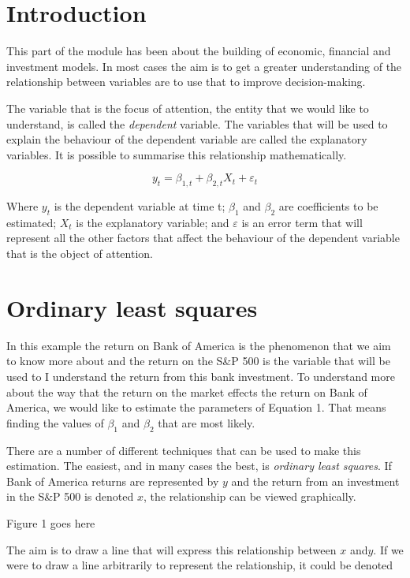 \documentclass{article}\usepackage[]{graphicx}\usepackage[]{color}
\begin{document}
\section{Introduction}

This part of the module has been about the building of economic, financial and investment models.  In most cases the aim is to get a greater understanding of the relationship between variables are to use that to improve decision-making. 

The variable that is the focus of attention, the entity that we would like to understand, is called the \emph{dependent} variable.  The variables that will be used to explain the behaviour of the dependent variable are called the explanatory variables.   It is possible to summarise this relationship mathematically.

\begin{equation}
y_t = \beta_{1, t} + \beta_{2, t} X_t + \varepsilon_t
\end{equation}

Where $y_t$ is the dependent variable at time t; $\beta_1$ and $\beta_2$ are coefficients to be estimated; $X_t$ is the explanatory variable; and $\varepsilon$ is an error term that will represent all the other factors that affect the behaviour of the dependent variable that is the object of attention.

\section{Ordinary least squares}
In this example the return on Bank of America is the phenomenon that we aim to know more about and the return on the S\&P 500 is the variable that will be used to I understand the return from this bank investment. To understand more about the way that the return on the market effects the return on Bank of America,  we would like to estimate the parameters of Equation 1.  That means finding the values of $\beta_1$ and $\beta_2$ that are most likely.   

There are a number of different techniques that can be used to make this estimation.  The easiest, and  in many cases the best, is \emph{ordinary least squares}.  If Bank of America returns are represented by $y$ and the return from an investment in the S\&P 500 is denoted $x$, the relationship can be viewed graphically.  

Figure 1 goes here

The aim is to draw a line that will express this relationship between $x$ and$y$.  If we were to draw a line arbitrarily to represent the relationship, it could be denoted
\end{document}
